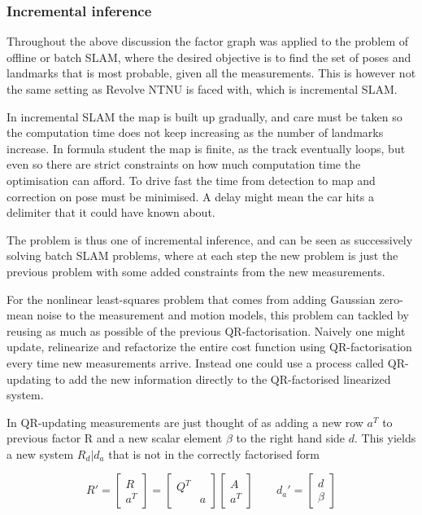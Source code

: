 \subsubsection{Incremental inference}

Throughout the above discussion the factor graph was applied to the problem of offline or batch SLAM, where the desired objective is to find the set of poses and landmarks that is most probable, given all the measurements. This is however not the same setting as Revolve NTNU is faced with, which is incremental SLAM.

In incremental SLAM the map is built up gradually, and care must be taken so the computation time does not keep increasing as the number of landmarks increase. In formula student the map is finite, as the track eventually loops, but even so there are strict constraints on how much computation time the optimisation can afford. To drive fast the time from detection to map and correction on pose must be minimised. A delay might mean the car hits a delimiter that it could have known about.

The problem is thus one of incremental inference, and can be seen as successively solving batch SLAM problems, where at each step the new problem is just the previous problem with some added constraints from the new measurements.

For the nonlinear least-squares problem that comes from adding Gaussian zero-mean noise to the measurement and motion models, this problem can tackled by reusing as much as possible of the previous QR-factorisation. Naively one might update, relinearize and refactorize the entire cost function using QR-factorisation every time new measurements arrive. Instead one could use a process called QR-updating to add the new information directly to the QR-factorised linearized system. 

In QR-updating measurements are just thought of as adding a new row $a^T$ to previous factor R and a new scalar element $\beta$ to the right hand side $d$. This yields a new system $R_d|d_a$ that is not in the correctly factorised form

\begin{equation}
    R' = \begin{bmatrix} R \\ a^T \end{bmatrix}=\begin{bmatrix} Q^T &  \\ & a \end{bmatrix}\begin{bmatrix} A \\ a^T \end{bmatrix} \quad \quad d_a' = \begin{bmatrix} d \\ \beta  \end{bmatrix}
\end{equation}

